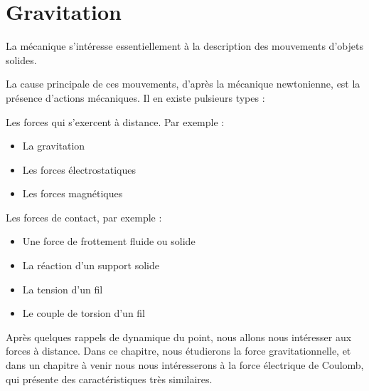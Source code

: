 \documentclass[11pt,fleqn]{book} %
\begin{document}








\setcounter{chapter}{0}

\chapter{Gravitation}

La mécanique s'intéresse essentiellement à la description des mouvements d'objets solides.

La cause principale de ces mouvements, d'après la mécanique newtonienne, est la présence d'actions mécaniques. Il en existe pulsieurs types :

Les forces qui s'exercent à distance. Par exemple :
\begin{itemize}
    \item La gravitation
    \item Les forces électrostatiques
    \item Les forces magnétiques
\end{itemize}

Les forces de contact, par exemple :
\begin{itemize}
    \item Une force de frottement fluide ou solide
    \item La réaction d'un support solide
    \item La tension d'un fil
    \item Le couple de torsion d'un fil
\end{itemize}

Après quelques rappels de dynamique du point, nous allons nous intéresser aux forces à distance. Dans ce chapitre, nous étudierons la force gravitationnelle, et dans un chapitre à venir nous nous intéresserons à la force électrique de Coulomb, qui présente des caractéristiques très similaires.
\end{document}
